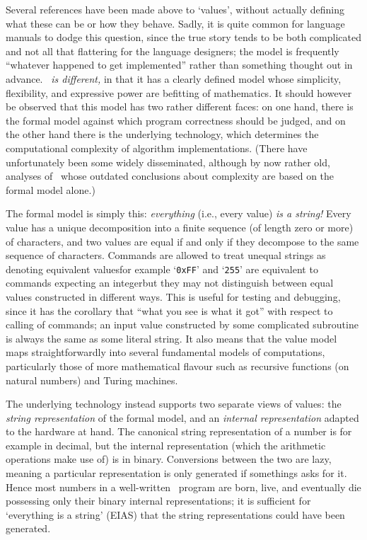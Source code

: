 \documentclass{mtmtcl}
\theoremstyle{plain}
\theoremstyle{remark}
\begin{document}
Several references have been made above to `values', without actually 
defining what these can be or how they behave. Sadly, it is quite 
common for language manuals to dodge this question, since the true 
story tends to be both complicated and not all that flattering for 
the language designers; the model is frequently ``whatever happened 
to get implemented'' rather than something thought out in advance. 
\emph{\Tcl\ is different,} in that it has a clearly defined model 
whose simplicity, flexibility, and expressive power are befitting of 
mathematics. It should however be observed that this model has two 
rather different faces: on one hand, there is the formal model 
against which program correctness should be judged, and on the other 
hand there is the underlying technology, which determines the 
computational complexity of algorithm implementations. (There have 
unfortunately been some widely disseminated, although by now rather 
old, analyses of \Tcl\ whose outdated conclusions about complexity 
are based on the formal model alone.)

The formal model is simply this: \emph{everything} (i.e., every 
value) \emph{is a string!} Every value has a unique decomposition 
into a finite sequence (of length zero or more) of characters, and 
two values are equal if and only if they decompose to the same 
sequence of characters. Commands are allowed to treat unequal 
strings as denoting equivalent values\Ldash for example 
`\texttt{0xFF}' and `\texttt{255}' are equivalent to commands 
expecting an integer\Rdash but they may not distinguish between equal 
values constructed in different ways. This is useful for testing and 
debugging, since it has the corollary that ``what you see is what it 
got'' with respect to calling of commands; an input value constructed 
by some complicated subroutine is always the same as some literal 
string. It also means that the value model maps 
straightforwardly into several fundamental models of computations, 
particularly those of more mathematical flavour such as 
recursive functions (on natural numbers) and Turing machines.

The underlying technology instead supports two separate views of 
values: the \emph{string representation} of the formal model, and an 
\emph{internal representation} adapted to the hardware at hand. The 
canonical string representation of a number is for example in 
decimal, but the internal representation (which the arithmetic 
operations make use of) is in binary. Conversions between the two are 
lazy, meaning a particular representation is only generated if 
somethings asks for it. Hence most numbers in a well-written \Tcl\ 
program are born, live, and eventually die possessing only their 
binary internal representations; it is sufficient for `everything is 
a string' (EIAS) that the string representations could have been 
generated.
\end{document}

